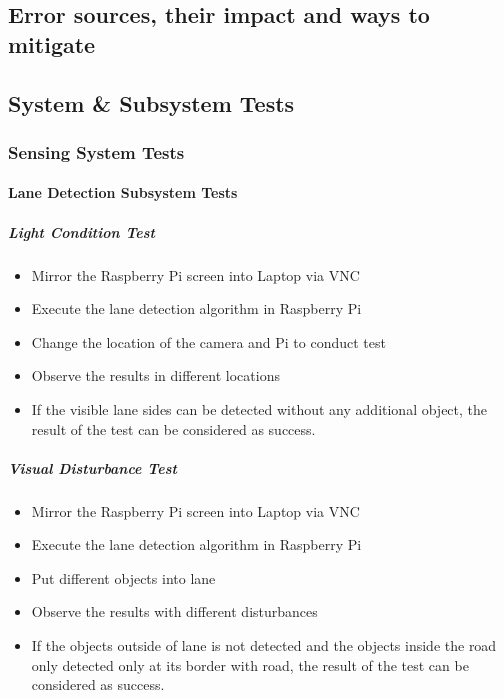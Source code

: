 \documentclass[a4paper,12pt]{article}
\begin{document}
			
	\newpage
	\subsection{ Error sources, their impact and ways to mitigate}
	
	
	\newpage

	\subsection{System \& Subsystem Tests }


	\subsubsection{Sensing System Tests}

	\paragraph{Lane Detection Subsystem Tests}	
	
		\subparagraph{Light Condition Test}
		
			\begin{itemize}
				\item Mirror the Raspberry Pi screen into Laptop via VNC 
				\item Execute the lane detection algorithm in Raspberry Pi
				\item Change the location of the camera and Pi to conduct test
				\item Observe the results in different locations  
				\item If the visible lane sides can be detected without any additional object, the result of the test can be considered as success.
			\end{itemize}
		
		\subparagraph{Visual Disturbance Test}
		
			\begin{itemize}
				\item Mirror the Raspberry Pi screen into Laptop via VNC 
				\item Execute the lane detection algorithm in Raspberry Pi
				\item Put different objects into lane
				\item Observe the results with different disturbances
				\item If the objects outside of lane is not detected and the objects inside the road only detected only at its border with road, the result of the test can be considered as success.
			\end{itemize}
		
\end{document}
